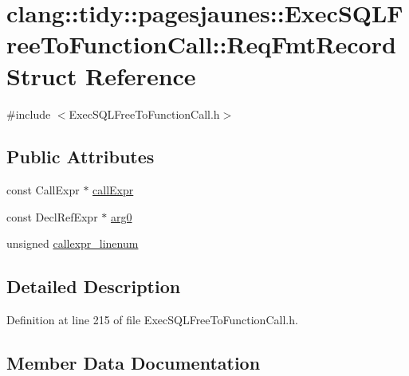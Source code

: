 \hypertarget{structclang_1_1tidy_1_1pagesjaunes_1_1_exec_s_q_l_free_to_function_call_1_1_req_fmt_record}{}\section{clang\+:\+:tidy\+:\+:pagesjaunes\+:\+:Exec\+S\+Q\+L\+Free\+To\+Function\+Call\+:\+:Req\+Fmt\+Record Struct Reference}
\label{structclang_1_1tidy_1_1pagesjaunes_1_1_exec_s_q_l_free_to_function_call_1_1_req_fmt_record}


{\ttfamily \#include $<$Exec\+S\+Q\+L\+Free\+To\+Function\+Call.\+h$>$}

\subsection*{Public Attributes}
\begin{DoxyCompactItemize}
\item 
const Call\+Expr $\ast$ \hyperlink{structclang_1_1tidy_1_1pagesjaunes_1_1_exec_s_q_l_free_to_function_call_1_1_req_fmt_record_af65c4da2a688ccb01f1bb431e8a70f63}{call\+Expr}
\item 
const Decl\+Ref\+Expr $\ast$ \hyperlink{structclang_1_1tidy_1_1pagesjaunes_1_1_exec_s_q_l_free_to_function_call_1_1_req_fmt_record_a8074d94d7b21b57fffbb8fc5736e9474}{arg0}
\item 
unsigned \hyperlink{structclang_1_1tidy_1_1pagesjaunes_1_1_exec_s_q_l_free_to_function_call_1_1_req_fmt_record_a0a8deabb3ce66b44512619edf0df3093}{callexpr\+\_\+linenum}
\end{DoxyCompactItemize}


\subsection{Detailed Description}


Definition at line 215 of file Exec\+S\+Q\+L\+Free\+To\+Function\+Call.\+h.



\subsection{Member Data Documentation}
\mbox{\label{structclang_1_1tidy_1_1pagesjaunes_1_1_exec_s_q_l_free_to_function_call_1_1_req_fmt_record_a8074d94d7b21b57fffbb8fc5736e9474}} 
